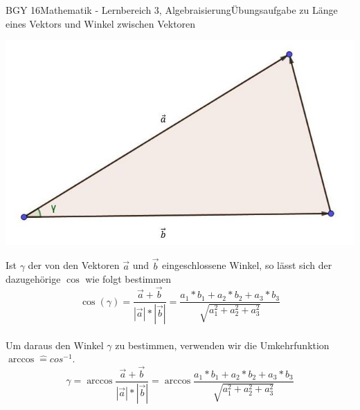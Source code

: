 \documentclass[oneside,openany,headings=optiontotoc,11pt,numbers=noenddot]{scrreprt}
\begin{document}
\begin{worksheet}{BGY 16}{Mathematik - Lernbereich 3, Algebraisierung}{Übungsaufgabe zu Länge eines Vektors und Winkel zwischen Vektoren}
\begin{framed}
			\centering
			\includegraphics[scale=0.45]{Bilder/Dreieck.jpg}\\
			\raggedright
			Ist \(\gamma\) der von den Vektoren \(\vec{a}\) und \(\vec{b}\) eingeschlossene Winkel, so lässt sich der dazugehörige \(\cos\) wie folgt bestimmen
			\[\cos(\gamma) = \frac{\vec{a}+\vec{b}}{|\vec{a}|*|\vec{b}|} = \frac{a_1*b_1 + a_2*b_2 + a_3*b_3}{\sqrt{a_1^2 + a_2^2 + a_3^2}}\]\\
			Um daraus den Winkel \(\gamma\) zu bestimmen, verwenden wir die Umkehrfunktion \(\arccos \widehat{=}cos^{-1}\).
			\[\gamma = \arccos{\frac{\vec{a}+\vec{b}}{|\vec{a}|*|\vec{b}|}} = \arccos{\frac{a_1*b_1 + a_2*b_2 + a_3*b_3}{\sqrt{a_1^2 + a_2^2 + a_3^2}}}\]
		\end{framed}
	\end{worksheet}
\end{document}
